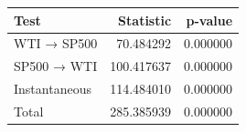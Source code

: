 \begin{tabular}{lrr}
\toprule
Test & Statistic & p-value \\
\midrule
WTI → SP500 & 70.484292 & 0.000000 \\
SP500 → WTI & 100.417637 & 0.000000 \\
Instantaneous & 114.484010 & 0.000000 \\
Total & 285.385939 & 0.000000 \\
\bottomrule
\end{tabular}
